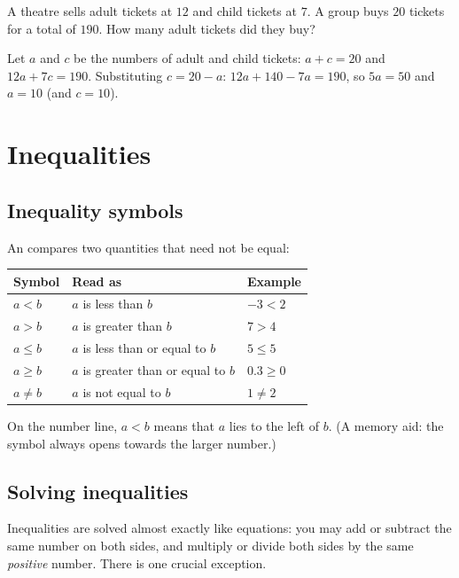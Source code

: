 \begin{exercise}
A theatre sells adult tickets at $12$ and child tickets at $7$. A group buys
$20$ tickets for a total of $190$. How many adult tickets did they buy?
\end{exercise}
\begin{solution}
Let $a$ and $c$ be the numbers of adult and child tickets: $a + c = 20$ and
$12a + 7c = 190$. Substituting $c = 20 - a$: $12a + 140 - 7a = 190$, so
$5a = 50$ and $a = 10$ (and $c = 10$).
\end{solution}

\section{Inequalities}\label{sec:inequalities}

\subsection{Inequality symbols}

An  compares two quantities that need not be equal:
\begin{center}
\renewcommand{\arraystretch}{1.2}
\begin{tabular}{@{}lll@{}}
\toprule
\textbf{Symbol} & \textbf{Read as} & \textbf{Example}\\
\midrule
$a < b$ & $a$ is less than $b$ & $-3 < 2$\\
$a > b$ & $a$ is greater than $b$ & $7 > 4$\\
$a \le b$ & $a$ is less than or equal to $b$ & $5 \le 5$\\
$a \ge b$ & $a$ is greater than or equal to $b$ & $0.3 \ge 0$\\
$a \neq b$ & $a$ is not equal to $b$ & $1 \neq 2$\\
\bottomrule
\end{tabular}
\end{center}
On the number line, $a < b$ means that $a$ lies to the left of $b$. (A memory
aid: the symbol always opens towards the larger number.)

\subsection{Solving inequalities}

Inequalities are solved almost exactly like equations: you may add or
subtract the same number on both sides, and multiply or divide both sides by
the same \emph{positive} number. There is one crucial exception.

